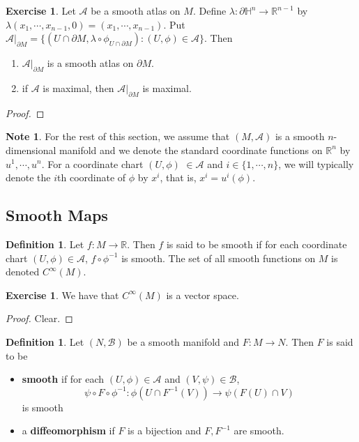 \documentclass[12pt]{amsart}
\theoremstyle{definition}
\newtheorem{defn}[definition]{Definition}
\newtheorem{note}[definition]{Note}
\newtheorem{ex}[definition]{Exercise}
\newcommand{\lam}{\lambda}
\renewcommand{\H}{\mathbb{H}}
\newcommand{\R}{\mathbb{R}}
\newcommand{\MA}{\mathcal{A}}
\newcommand{\MB}{\mathcal{B}}
\begin{document}
	\begin{ex}
		Let $\MA$ be a smooth atlas on $M$. Define $\lam: \partial \H^n \rightarrow \R^{n-1}$ by $\lam(x_1, \cdots, x_{n-1}, 0) = (x_1, \cdots, x_{n-1})$. Put $\MA|_{\partial M} = \{(U \cap \partial M, \lam \circ \phi_{U \cap \partial M}): (U, \phi) \in \MA\}$. Then 
		\begin{enumerate}
			\item $\MA|_{\partial M}$ is a smooth atlas on $\partial M$.
			\item if $ \MA $ is maximal, then $\MA|_{\partial M}$ is maximal.
		\end{enumerate}
	\end{ex}

	\begin{proof}
		
	\end{proof}
	
	\begin{note}
		For the rest of this section, we assume that $(M, \MA)$ is a smooth $n$-dimensional manifold and we denote the standard coordinate functions on $\R^n$ by $u^1, \cdots, u^n$. For a coordinate chart $(U, \phi)$ $\in \MA$ and $i \in \{1, \cdots, n\}$, we will typically denote the $i$th coordinate of $\phi$ by $x^i$, that is,  $x^i = u^i(\phi)$.
	\end{note}
	
	\newpage 
	
	
	\subsection{Smooth Maps}	
	
	\begin{defn}
		Let $f: M \rightarrow \R$. Then $f$ is said to be smooth if for each coordinate chart $(U, \phi) \in \MA$, $f \circ \phi^{-1}$ is smooth. The set of all smooth functions on $M$ is denoted $C^{\infty}(M)$. 
	\end{defn}

	\begin{ex}
		We have that $C^{\infty}(M)$ is a vector space.
	\end{ex}

	\begin{proof}
		Clear.
	\end{proof}

	\begin{defn}
		Let $(N, \MB)$ be a smooth manifold and $F: M \rightarrow N$. Then $F$ is said to be 
		\begin{itemize}
		\item \textbf{smooth} if for each $(U, \phi) \in \MA$ and $(V, \psi) \in \MB$, $$\psi \circ F \circ \phi^{-1}: \phi(U \cap F^{-1}(V)) \rightarrow \psi(F(U) \cap V)$$ is smooth 
		\item a \textbf{diffeomorphism} if $F$ is a bijection and $F,F^{-1}$ are smooth.
		\end{itemize}
	\end{defn}
	
\end{document}
